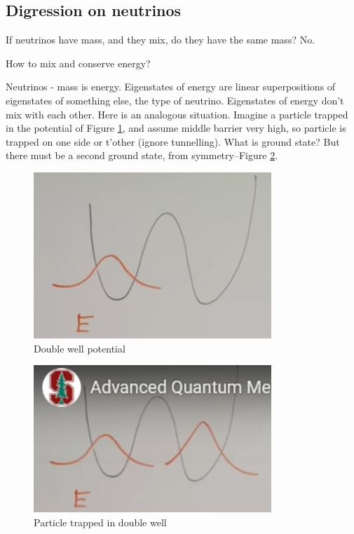 \documentclass[]{article}
\begin{document}
\subsection{Digression on neutrinos}

If neutrinos have mass, and they mix, do they have the same mass? No.

How to mix and conserve energy?

Neutrinos - mass is energy. Eigenstates of energy are linear superpositions of eigenstates of something else, the type of neutrino. Eigenstates of energy don't mix with each other. Here is an analogous situation. Imagine a particle trapped in the potential of Figure \ref{fig:particle_mixed_left}, and assume middle barrier very high, so particle is trapped on one side or t'other (ignore tunnelling). What is ground state? But there must be a second ground state, from symmetry--Figure \ref{fig:double:well}.

\begin{figure}[H]
	\caption{Double well potential}\label{fig:particle_mixed_left}
	\includegraphics[width=0.8\textwidth]{particle_mixed_left}
\end{figure}

\begin{figure}[H]
	\caption{Particle trapped in double well}\label{fig:double:well}
	\includegraphics[width=0.8\textwidth]{particle_mixed}
\end{figure}
\end{document}
